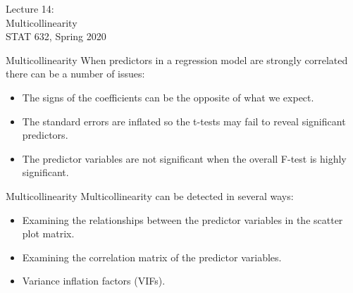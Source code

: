 \documentclass[10pt]{beamer}\usepackage[]{graphicx}\usepackage[]{color}
\begin{document}
\begin{frame}
\large
Lecture 14:\\ 
Multicollinearity\\
STAT 632, Spring 2020\\
\end{frame}

\begin{frame}{Multicollinearity}
When predictors in a regression model are strongly correlated there can be a number of issues:
\vspace{5pt}
\begin{itemize}
\item The signs of the coefficients can be the opposite of what we expect.
\vspace{5pt}
\item The standard errors are inflated so the t-tests may fail to reveal significant predictors.
\vspace{5pt}
\item The predictor variables are not significant when the overall F-test is highly significant.
\end{itemize}
\end{frame}

\begin{frame}{Multicollinearity}
Multicollinearity can be detected in several ways:
\vspace{5pt}
\begin{itemize}
\item Examining the relationships between the predictor variables in the scatter plot matrix.
\vspace{5pt}
\item Examining the correlation matrix of the predictor variables.
\vspace{5pt}
\item Variance inflation factors (VIFs).
\end{itemize}
\end{frame}
\end{document}
